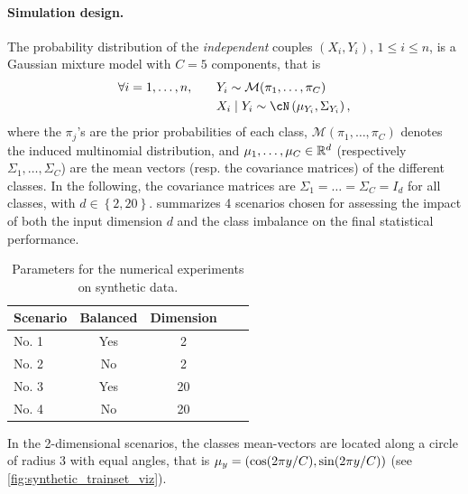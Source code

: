 \documentclass[twoside]{article}
\theoremstyle{definition}
\theoremstyle{remark}
\newcommand{\acc}[1]{\left\{ #1 \right\}}
\begin{document}
\paragraph{Simulation design.}
%
The probability distribution of the \emph{independent} couples $(X_i,Y_i)$, $1\leq i\leq n$, is a Gaussian mixture model with $C=5$ components, that is 
\begin{align*}
\forall i=1,\ldots,n,\qquad & Y_i \sim \mathcal{M}(\pi_1,\ldots,\pi_C) \\
         &   X_i \mid Y_i  \sim \cN\pa{\mu_{Y_i}, \Sigma_{Y_i}},    
\end{align*}
where the $\pi_j$'s are the prior probabilities of each class, $\mathcal{M}(\pi_1,\ldots,\pi_C)$ denotes the induced multinomial distribution, and $\mu_1,\ldots,\mu_C \in \mathbb{R}^d$ (respectively $\Sigma_1,\ldots,\Sigma_C$) are the mean vectors (resp. the covariance matrices) of the different classes.
%
In the following, the covariance matrices are $\Sigma_1= \dots =\Sigma_C=I_d$ for all classes, with $d\in\acc{2,20}$.
%
 summarizes 4 scenarios chosen for assessing the impact of both the input dimension $d$ and the class imbalance on the final statistical performance.
%
%
\begin{table}[h]
    \caption{Parameters for the numerical experiments on synthetic data.}
    \label{tab:synth_exp_params}
    \centering
    \begin{tabular}{lcccc}
    \toprule
        Scenario & Balanced & Dimension \\ %
    \midrule
         No. 1     & Yes      & 2         \\ %
         No. 2     & No       & 2         \\ %
         No. 3     & Yes      & 20        \\ %
         No. 4     & No       & 20        \\ %
    \bottomrule
    \end{tabular}
\end{table}
In the 2-dimensional scenarios, the classes mean-vectors are located along a circle of radius $3$ with equal angles, that is $\mu_y = \left(\cos(2\pi y / C), \sin(2\pi y / C)\right)$ (see \cref{fig:synthetic_trainset_viz}).
\end{document}
